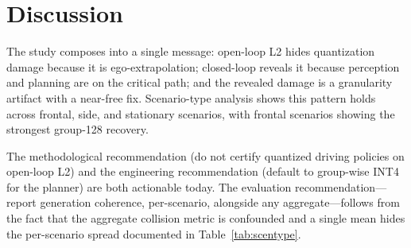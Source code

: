 \documentclass[11pt]{article}
\begin{document}
\section{Discussion}
The study composes into a single message: open-loop L2 hides quantization damage because it is
ego-extrapolation; closed-loop reveals it because perception and planning are on the critical path;
and the revealed damage is a granularity artifact with a near-free fix. Scenario-type analysis shows
this pattern holds across frontal, side, and stationary scenarios, with frontal scenarios showing the
strongest group-128 recovery.

The methodological recommendation (do not certify quantized driving policies on open-loop L2) and
the engineering recommendation (default to group-wise INT4 for the planner) are both actionable
today. The evaluation recommendation---report generation coherence, per-scenario, alongside any
aggregate---follows from the fact that the aggregate collision metric is confounded and a single
mean hides the per-scenario spread documented in Table~\ref{tab:scentype}.
\end{document}
